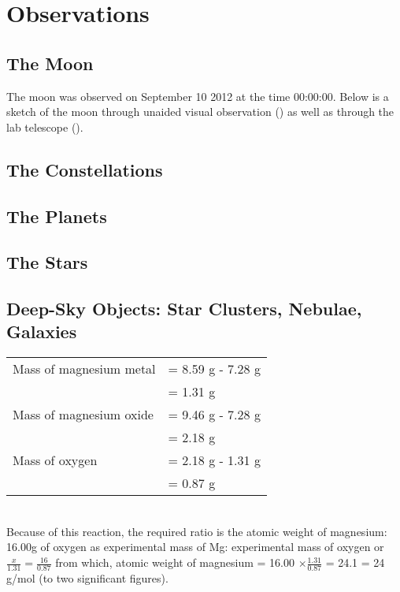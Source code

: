 \documentclass{article}
\begin{document}

\section{Observations}

\subsection{The Moon}
The moon was observed on September 10 2012 at the time 00:00:00. Below is a sketch of the moon through unaided visual
observation () as well as through the lab telescope ().

\subsection{The Constellations}

\subsection{The Planets}

\subsection{The Stars}

\subsection{Deep-Sky Objects: Star Clusters, Nebulae, Galaxies}

\begin{tabular}{ll}
Mass of magnesium metal & = 8.59 g - 7.28 g\\
& = 1.31 g\\
Mass of magnesium oxide & = 9.46 g - 7.28 g\\
& = 2.18 g\\
Mass of oxygen & = 2.18 g - 1.31 g\\
& = 0.87 g
\end{tabular}\\
Because of this reaction, the required ratio is the atomic weight of magnesium: 16.00g of oxygen as experimental mass of Mg: experimental mass of oxygen or $\frac{x}{1.31}=\frac{16}{0.87}$ from which, atomic weight of magnesium = 16.00 $\times \frac{1.31}{0.87}$ = 24.1 = 24 g/mol (to two significant figures).
\end{document}
